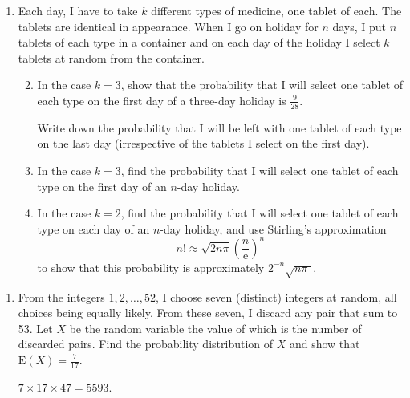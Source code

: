 \documentclass[a4, 11pt]{report}
\newlength{\qspace}
\newcounter{qnumber}
\newenvironment{question}%
 {\vspace{\qspace}
  \begin{enumerate}[\bfseries 1\quad][10]%
    \setcounter{enumi}{\value{qnumber}}%
    \item%
 }
{
  \end{enumerate}
  \filbreak
  \stepcounter{qnumber}
 }
\newenvironment{questionparts}[1][1]%
 {
  \begin{enumerate}[\bfseries (i)]%
    \setcounter{enumii}{#1}
    \addtocounter{enumii}{-1}
    \setlength{\itemsep}{5mm}
    \setlength{\parskip}{8pt}
 }
 {
  \end{enumerate}
 }
\def\e{{\mathrm e}}
\def\E{{\mathrm E}}
\begin{document}
\begin{question}
Each day, I have to take $k$ different types of medicine, one
tablet of each. The tablets are identical in appearance. When I go
on holiday for $n$ days, I put $n$ tablets of each type in a
container and on each day of the holiday I select $k$ tablets
at random from the container.

\begin{questionparts}
\item In the case $k=3$, show that the probability that
I will select one tablet of each type on the first day of a
three-day holiday is $\frac9{28}$. 

Write down  the probability
that I will be left with one tablet of each type on the 
last day (irrespective of the tablets I select on the first day).

\item In the case $k=3$, find the probability that
I will select one tablet of each type on the first day of an
$n$-day holiday. 

\item In the case $k=2$,   find the probability that
I will select one tablet of each type on each day of an
$n$-day holiday, and use Stirling's approximation
\[
n!\approx \sqrt{2n\pi} \left(\frac n\e\right)^n
\]
to show that this probability is approximately $2^{-n} \sqrt{n\pi\;}$.

\end{questionparts}
\end{question}

\begin{question}
From the integers $1, 2, \ldots , 52$, I choose seven 
(distinct) integers at random, all choices being equally likely. From these
seven, I discard any pair that sum to 53. Let $X$ be the random variable
the value of which is the number of 
discarded pairs. Find the probability distribution of $X$ and show
that $\E   (X) = \frac 7 {17}$.

 $7\times 17 \times 47 =5593$.
\end{question}
\end{document}
